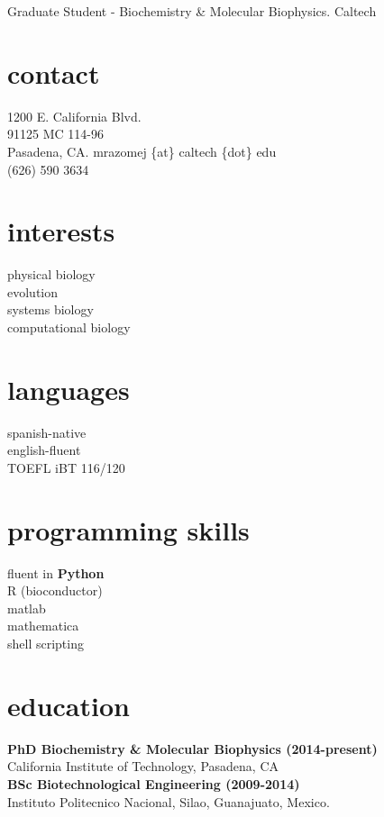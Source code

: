 \documentclass[]{friggeri-cv}
\begin{document}
       {\hspace{40 mm}Graduate Student - Biochemistry \& Molecular Biophysics. Caltech}


\begin{aside}
	\section{contact}
		1200 E. California Blvd.\\
		91125 MC 114-96\\
		Pasadena, CA.
  		mrazomej \{at\} caltech \{dot\} edu\\
  		(626) 590 3634
	
	\section{interests}
	physical biology\\
	evolution\\
	systems biology\\
	computational biology\\
	
	\section{languages}
		spanish-native\\
		english-fluent\\ 
		TOEFL iBT 116/120
    
    	\section{programming skills}
		fluent in \textbf{Python}\\
    		R (bioconductor)\\matlab\\mathematica\\shell scripting
\end{aside}


\section{education}
	\textbf{PhD Biochemistry \& Molecular Biophysics (2014-present)}\\
	California Institute of Technology, Pasadena, CA\\
    	\textbf{BSc Biotechnological Engineering (2009-2014)}\\
    	Instituto Politecnico Nacional, Silao, Guanajuato, Mexico.\\
\end{document}
